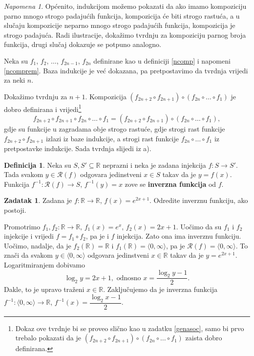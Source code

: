 \documentclass{book}
\renewenvironment{proof}{%
    \vspace{-\parskip}\begin{oldproof}%
    }{%
    \end{oldproof}%
}
\theoremstyle{definition}
\theoremstyle{definition}
\newtheorem{definition}{Definicija}
\newtheorem{exercise}{Zadatak}
\theoremstyle{remark}
\newtheorem{remark}{Napomena}
\begin{document}
\begin{remark}
Općenito, indukcijom možemo pokazati da ako imamo kompoziciju parno mnogo strogo padajućih funkcija, kompozicija će biti strogo rastuća, a u slučaju kompozicije neparno mnogo strogo padajućih funkcija, kompozicija je strogo padajuća. Radi ilustracije, dokažimo tvrdnju za kompoziciju parnog broja funkcija, drugi slučaj dokazuje se potpuno analogno. 

Neka su $f_1$, $f_2$, $\dots$, $f_{2n-1}$, $f_{2n}$ definirane kao u definiciji \ref{ncomp} i napomeni \ref{ncomprem}. Baza indukcije je već dokazana, pa pretpostavimo da tvrdnja vrijedi za neki $n$. 

Dokažimo tvrdnju za $n+1$. Kompozicija $(f_{2n+2}\circ f_{2n+1})\circ(f_{2n}\circ \dots \circ f_1)$ je dobro definirana i vrijedi\footnote{Dokaz ove tvrdnje bi se proveo slično kao u zadatku \ref{genasoc}, samo bi prvo trebalo pokazati da je $(f_{2n+2}\circ f_{2n+1})\circ(f_{2n}\circ \dots \circ f_1)$ zaista dobro definirana.}
$$f_{2n+2}\circ f_{2n+1}\circ f_{2n}\circ \dots \circ f_{1}=(f_{2n+2}\circ f_{2n+1})\circ (f_{2n}\circ \dots \circ f_{1}),$$ gdje su funkcije u zagradama obje strogo rastuće, gdje strogi rast funkcije $f_{2n+2}\circ f_{2n+1}$ izlazi iz baze indukcije, a strogi rast funkcije $f_{2n}\circ \dots \circ f_{1}$ iz pretpostavke indukcije. Sada tvrdnja slijedi iz a).
\end{remark}
\begin{definition}
Neka su $S, S'\subseteq \mathbb{R}$ neprazni i neka je zadana injekcija $f : S\to S'$. Tada svakom $y\in \mathcal{R}(f)$ odgovara jedinstveni $x\in S$ takav da je $y=f(x)$. Funkcija $f^{-1} : \mathcal{R}(f)\to S$, $f^{-1}(y)=x$ zove se \textbf{inverzna funkcija} od $f$.
\end{definition}
\begin{exercise}
\label{inv1}
Zadana je $f : \mathbb{R}\to \mathbb{R}$, $f(x)=e^{2x+1}$. Odredite inverznu funkciju, ako postoji.
\end{exercise}
\begin{proof}
Promotrimo $f_1, f_2 : \mathbb{R}\to \mathbb{R}$, $f_1(x)=e^x$, $f_2(x)=2x+1$. Uočimo da su $f_1$ i $f_2$ injekcije i vrijedi $f=f_1\circ f_2$, pa je i $f$ injekcija. Zato ona ima inverznu funkciju. Uočimo, nadalje, da je $f_2(\mathbb{R})=\mathbb{R}$ i $f_1(\mathbb{R})=\langle 0, \infty\rangle$, pa je $\mathcal{R}(f)=\langle 0, \infty\rangle$. To znači da svakom $y\in \langle 0, \infty\rangle$ odgovara jedinstveni $x\in \mathbb{R}$ takav da je $y=e^{2x+1}$. Logaritmiranjem dobivamo
$$\log_2{y}=2x+1,\text{ odnosno } x=\dfrac{\log_2{y}-1}{2}.$$
Dakle, to je upravo traženi $x\in \mathbb{R}$. Zaključujemo da je inverzna funkcija $f^{-1} : \langle 0, \infty\rangle \to \mathbb{R}$, $f^{-1}(x)=\dfrac{\log_2{x}-1}{2}$.
\end{proof}
\end{document}
